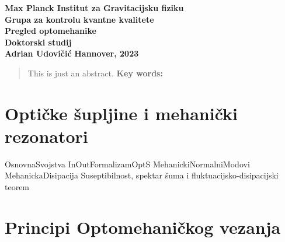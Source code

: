 \documentclass[10pt,leqno]{article}
\begin{document}
\begin{titlepage}
	\begin{center}
		{\LARGE \textbf{Max Planck Institut za Gravitacijsku fiziku}}\\[0.1cm]
		{\LARGE \textbf{Grupa za kontrolu kvantne kvalitete}}\\[1.5cm]
		{\LARGE \textbf{Pregled optomehanike}}\\[1.0cm]
		{\LARGE \textbf{Doktorski studij}}\\[2.5cm]
		{\LARGE \textbf{Adrian Udovičić}}
		\vfill
		\large\textbf{{Hannover, 2023} }
	\end{center}
\end{titlepage}

\newpage
{}
\begin{abstract}
	This is just an abstract.
	\vfill
	\textbf{Key words:}
\end{abstract}
\newpage
\tableofcontents
\hrulefill
\newpage

\part{Optičke šupljine i mehanički rezonatori}
{OsnovnaSvojstva}
\newpage
{InOutFormalizamOptS}
{MehanickiNormalniModovi}
{MehanickaDisipacija}
{Suseptibilnost, spektar šuma i fluktuacijsko-disipacijski teorem}

\newpage
\part{Principi Optomehaničkog vezanja}
\newpage


\listoftables
\listoffigures
\end{document}
